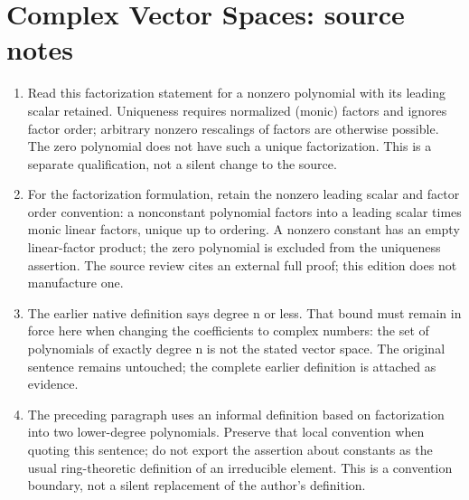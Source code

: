 \section*{Complex Vector Spaces: source notes}
\begin{enumerate}
\item Read this factorization statement for a nonzero polynomial with its leading scalar retained. Uniqueness requires normalized (monic) factors and ignores factor order; arbitrary nonzero rescalings of factors are otherwise possible. The zero polynomial does not have such a unique factorization. This is a separate qualification, not a silent change to the source.
\item For the factorization formulation, retain the nonzero leading scalar and factor order convention: a nonconstant polynomial factors into a leading scalar times monic linear factors, unique up to ordering. A nonzero constant has an empty linear-factor product; the zero polynomial is excluded from the uniqueness assertion. The source review cites an external full proof; this edition does not manufacture one.
\item The earlier native definition says degree n or less. That bound must remain in force here when changing the coefficients to complex numbers: the set of polynomials of exactly degree n is not the stated vector space. The original sentence remains untouched; the complete earlier definition is attached as evidence.
\item The preceding paragraph uses an informal definition based on factorization into two lower-degree polynomials. Preserve that local convention when quoting this sentence; do not export the assertion about constants as the usual ring-theoretic definition of an irreducible element. This is a convention boundary, not a silent replacement of the author’s definition.
\end{enumerate}
